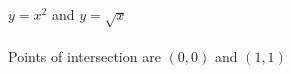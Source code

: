 {$y=x^2$ and $y=\sqrt{x}$}
{\text{}\\ \label{fig:02_04_ex_21} \\
Points of intersection are $(0,0)$ and $(1,1)$}

